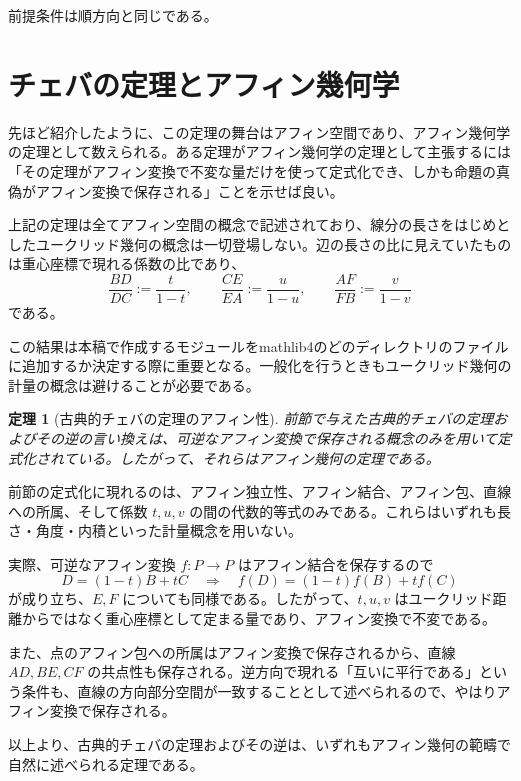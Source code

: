 \documentclass[a4paper,12pt]{bxjsbook}
\makeatletter
\newlength{\customindent}
\newenvironment{body}{
  \par
  \begingroup
  \setlength{\leftskip}{\customindent}
  \setlength{\rightskip}{0pt}
  \setlength{\parindent}{1em}
  \setlength{\displayindent}{\customindent}
  \setlength{\displaywidth}{\dimexpr\linewidth-\customindent\relax}
}{
  \par
  \endgroup
}
\theoremstyle{theorem}
\newtheorem{theorem}{定理}[chapter]
\renewenvironment{proof}[1][\proofname]{%
  \par\pushQED{\qed}%
  \normalfont
  \topsep6\p@\@plus6\p@\relax
  \list{}{%
    \leftmargin=\customindent
    \rightmargin=0pt
    \labelwidth=0pt
    \labelsep=0pt
    \itemindent=0pt
    \listparindent=0pt
    \parsep=0pt
  }%
  \item[\itshape #1\@addpunct{.}\hspace{0.5em}]%
  \setlength{\displayindent}{\customindent}%
  \setlength{\displaywidth}{\dimexpr\linewidth-\customindent\relax}%
  \ignorespaces
}{%
  \popQED\endlist\@endpefalse
}
\makeatother
\begin{document}
    \begin{body}
        \indent 前提条件は順方向と同じである。
    \end{body}

    \section{チェバの定理とアフィン幾何学}
        
    \begin{body}
        \indent 先ほど紹介したように、この定理の舞台はアフィン空間であり、アフィン幾何学の定理として数えられる。ある定理がアフィン幾何学の定理として主張するには「その定理がアフィン変換で不変な量だけを使って定式化でき、しかも命題の真偽がアフィン変換で保存される」ことを示せば良い。

        \indent 上記の定理は全てアフィン空間の概念で記述されており、線分の長さをはじめとしたユークリッド幾何の概念は一切登場しない。辺の長さの比に見えていたものは重心座標で現れる係数の比であり、
        \[
        \dfrac{BD}{DC} := \dfrac{t}{1-t},\qquad
        \dfrac{CE}{EA} := \dfrac{u}{1-u},\qquad
        \dfrac{AF}{FB} := \dfrac{v}{1-v}
        \]
        である。

        \indent この結果は本稿で作成するモジュールをmathlib4のどのディレクトリのファイルに追加するか決定する際に重要となる。一般化を行うときもユークリッド幾何の計量の概念は避けることが必要である。

    \end{body}

    \begin{theorem}[古典的チェバの定理のアフィン性]
        前節で与えた古典的チェバの定理およびその逆の言い換えは、可逆なアフィン変換で保存される概念のみを用いて定式化されている。したがって、それらはアフィン幾何の定理である。
    \end{theorem}

    \begin{proof}
        前節の定式化に現れるのは、アフィン独立性、アフィン結合、アフィン包、直線への所属、そして係数 $t,u,v$ の間の代数的等式のみである。これらはいずれも長さ・角度・内積といった計量概念を用いない。

        実際、可逆なアフィン変換 $f:P\to P$ はアフィン結合を保存するので
        \[
          D=(1-t)B+tC
          \quad\Longrightarrow\quad
          f(D)=(1-t)f(B)+t f(C)
        \]
        が成り立ち、$E,F$ についても同様である。したがって、$t,u,v$ はユークリッド距離からではなく重心座標として定まる量であり、アフィン変換で不変である。

        また、点のアフィン包への所属はアフィン変換で保存されるから、直線 $AD,BE,CF$ の共点性も保存される。逆方向で現れる「互いに平行である」という条件も、直線の方向部分空間が一致することとして述べられるので、やはりアフィン変換で保存される。

        以上より、古典的チェバの定理およびその逆は、いずれもアフィン幾何の範疇で自然に述べられる定理である。
    \end{proof}
\end{document}
